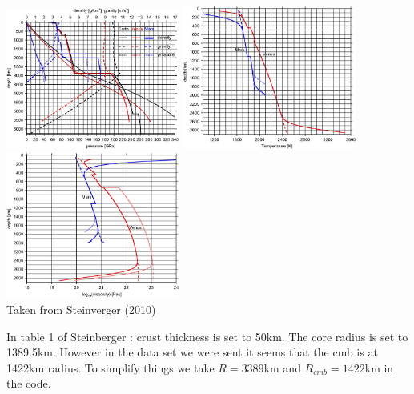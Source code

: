 \begin{center}
\includegraphics[width=5.7cm]{python_codes/fieldstone_96/images/stwt10_b}
\includegraphics[width=5.7cm]{python_codes/fieldstone_96/images/stwt10_c}
\includegraphics[width=5.7cm]{python_codes/fieldstone_96/images/stwt10_d}\\
{\captionfont Taken from Steinverger \etal (2010) \cite{stwt10}}
\end{center}

In table 1 of Steinberger \etal \cite{stwt10}: crust thickness is set to 50km. The core radius is set 
to 1389.5km. However in the data set we were sent it seems that the cmb is at 1422\si{\km}
radius.
To simplify things we take $R=3389\si{\km}$ and $R_{cmb}=1422\si{\km}$ in the code.

